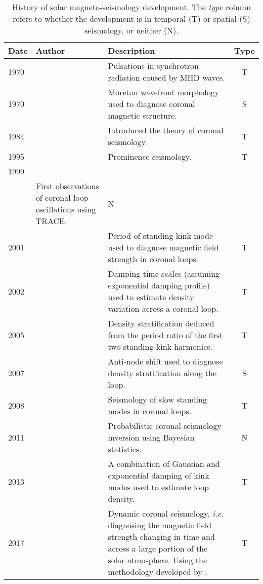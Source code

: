 \documentclass[12pt]{../style-files/ociamthesis}
\begin{document}
\begin{table}
	\centering
	\begin{tabularx}{\linewidth}{l l X c}
		\toprule
		Date & Author & Description & Type \\
		\midrule
		1970 & \citeauthor{ros70} & Pulsations in synchrotron radiation caused by MHD waves. & T \\
		1970 & \citeauthor{uch70} & Moreton wavefront morphology used to diagnose coronal magnetic structure. & S \\
		1984 & \citeauthor{rob_etal84} & Introduced the theory of coronal seismology. & T \\
		1995 & \citeauthor{tan95} & Prominence seismology. & T \\
		1999 & \makecell[tl]{\citeauthor{asc_etal99} \\ \citeauthor{nak_etal99}}  & First observations of coronal loop oscillations using TRACE. & N \\
		2001 & \citetalias{nak_etal01} & Period of standing kink mode used to diagnose magnetic field strength in coronal loops. & T \\
		2002 & \citeauthor{goo_etal02} & Damping time scales (assuming exponential damping profile) used to estimate density variation across a coronal loop. & T \\
		2005 & \citeauthor{and_etal05} & Density stratification deduced from the period ratio of the first two standing kink harmonics. & T \\
		2007 & \citeauthor{ver_etal07} & Anti-node shift used to diagnose density stratification along the loop. & S \\
		2008 & \citetalias{erd_etal08} & Seismology of slow standing modes in coronal loops. & T \\
		2011 & \citetalias{arr_etal11} & Probabilistic coronal seismology inversion using Bayesian statistics. & N \\
		2013 & \citeauthor{pas_etal13} & A combination of Gaussian and exponential damping of kink modes used to estimate loop density. & T \\
		2017 & \citeauthor{lon_etal17} & Dynamic coronal seismology, \textit{i.e.} diagnosing the magnetic field strength changing in time and across a large portion of the solar atmosphere. Using the methodology developed by \cite{mor_etal15}. & T \\
		\bottomrule
	\end{tabularx}
	\caption{History of solar magneto-seismology development. The \textit{type} column refers to whether the development is in temporal (T) or spatial (S) seismology, or neither (N).}
	\label{table: SMS history}
\end{table}
\end{document}
